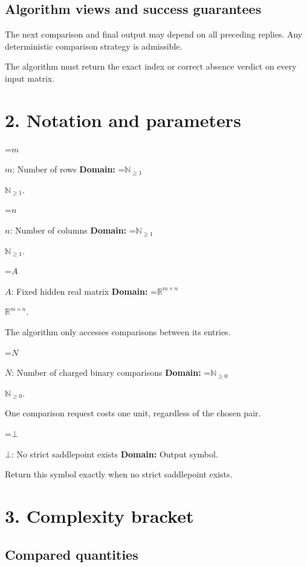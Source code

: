 \documentclass[10pt,a4paper]{article}
\newcommand{\AtlasMath}[1]{\par\begingroup\centering\setbox0=\hbox{$\displaystyle #1$}\ifdim\wd0>1.4\linewidth\typeout{ATLAS WIDE FORMULA: \the\wd0}\fi\ifdim\wd0>\linewidth\resizebox{\linewidth}{!}{\box0}\else\box0\fi\par\endgroup}
\newcommand{\AtlasInlineMath}[1]{\begingroup\setbox0=\hbox{$#1$}\ifdim\wd0>.4\linewidth\endgroup\AtlasMath{#1}\else\endgroup$#1$\fi}
\begin{document}
\subsection{Algorithm views and success guarantees}


The next comparison and final output may depend on all preceding replies. Any deterministic comparison strategy is admissible.



The algorithm must return the exact index or correct absence verdict on every input matrix.



\section{2. Notation and parameters}


\AtlasInlineMath{m}: Number of rows \textbf{Domain:} \AtlasInlineMath{\mathbb N_{\ge1}}.



\AtlasInlineMath{n}: Number of columns \textbf{Domain:} \AtlasInlineMath{\mathbb N_{\ge1}}.



\AtlasInlineMath{A}: Fixed hidden real matrix \textbf{Domain:} \AtlasInlineMath{\mathbb R^{m\times n}}.



The algorithm only accesses comparisons between its entries.



\AtlasInlineMath{N}: Number of charged binary comparisons \textbf{Domain:} \AtlasInlineMath{\mathbb N_{\ge0}}.



One comparison request costs one unit, regardless of the chosen pair.



\AtlasInlineMath{\bot}: No strict saddlepoint exists \textbf{Domain:} Output symbol.



Return this symbol exactly when no strict saddlepoint exists.



\section{3. Complexity bracket}


\subsection{Compared quantities}
\end{document}
